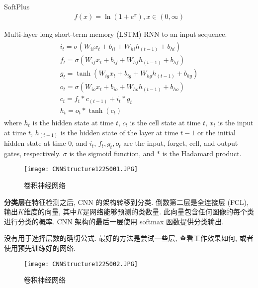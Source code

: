 SoftPlus \cite{glorot2011}
\begin{align}
  f(x)=\ln \left(1+e^{x}\right), x\in (0, \infty)
\end{align}

Multi-layer long short-term memory (LSTM) RNN to an input sequence.
\begin{align}
\begin{array}{l}
{i_{t}=\sigma\left(W_{i i} x_{t}+b_{i i}+W_{h i} h_{(t-1)}+b_{h i}\right)} \\
{f_{t}=\sigma\left(W_{i f} x_{t}+b_{i f}+W_{h f} h_{(t-1)}+b_{h f}\right)} \\
{g_{t}=\tanh \left(W_{i g} x_{t}+b_{i g}+W_{h g} h_{(t-1)}+b_{h g}\right)} \\
{o_{t}=\sigma\left(W_{i o} x_{t}+b_{i o}+W_{h o} h_{(t-1)}+b_{h o}\right)} \\
{c_{t}=f_{t} * c_{(t-1)}+i_{t} * g_{t}} \\
{h_{t}=o_{t} * \tanh \left(c_{t}\right)}
\end{array}
\end{align}
where $h_t$ is the hidden state at time $t$, $c_t$ is the cell state at time $t$, $x_t$ is the input at time $t$, $h_{(t-1)}$ is the hidden state of the layer at time $t-1$ or the initial hidden state at time 0,
and $i_t$, $f_t, g_t, o_t$ are the input, forget, cell, and output gates, respectively. $\sigma$ is the sigmoid function, and $*$ is the Hadamard product.
\begin{figure}[H]
\centering
\texttt{[image: CNNStructure1225001.JPG]}
\caption{卷积神经网络}
\label{CNNStructure1225001}
\end{figure}

\textbf{分类层}在特征检测之后, CNN 的架构转移到分类. 倒数第二层是全连接层 (FCL), 输出$K$维度的向量, 其中$K$是网络能够预测的类数量. 此向量包含任何图像的每个类进行分类的概率. CNN 架构的最后一层使用 softmax 函数提供分类输出.

没有用于选择层数的确切公式. 最好的方法是尝试一些层, 查看工作效果如何, 或者使用预先训练好的网络.
\begin{figure}[H]
\centering
\texttt{[image: CNNStructure1225002.JPG]}
\caption{卷积神经网络}
\label{CNNStructure1225002}
\end{figure}

